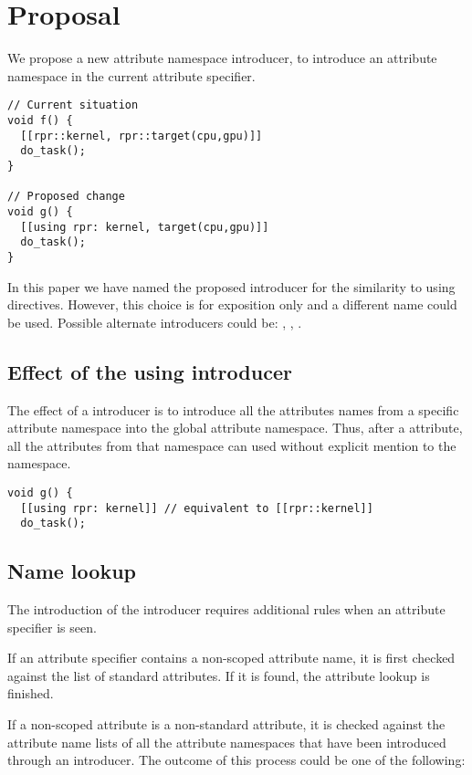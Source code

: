 \section{Proposal}

We propose a new attribute namespace introducer, to introduce an attribute
namespace in the current attribute specifier.

\begin{lstlisting}
// Current situation
void f() {
  [[rpr::kernel, rpr::target(cpu,gpu)]]
  do_task();
}

// Proposed change
void g() {
  [[using rpr: kernel, target(cpu,gpu)]]
  do_task();
}
\end{lstlisting}

In this paper we have named the proposed introducer  for the similarity to using directives. However,
this choice is for exposition only and a different name could be used. Possible alternate introducers could be:
,
,
.

\subsection{Effect of the using introducer}

The effect of a  introducer is to introduce all the attributes
names from a specific attribute namespace into the global attribute namespace.
Thus, after a  attribute, all the attributes from that namespace
can used without explicit mention to the namespace.

\begin{lstlisting}
void g() {
  [[using rpr: kernel]] // equivalent to [[rpr::kernel]]
  do_task();
\end{lstlisting}

\subsection{Name lookup}

The introduction of the  introducer requires additional
rules when an attribute specifier is seen. 

If an attribute specifier contains a non-scoped attribute name, it is
first checked against the list of standard attributes. If it is found,
the attribute lookup is finished.

If a non-scoped attribute is a non-standard attribute, it is checked
against the attribute name lists of all the attribute namespaces that have been
introduced through an  introducer. The outcome of this process
could be one of the following:

